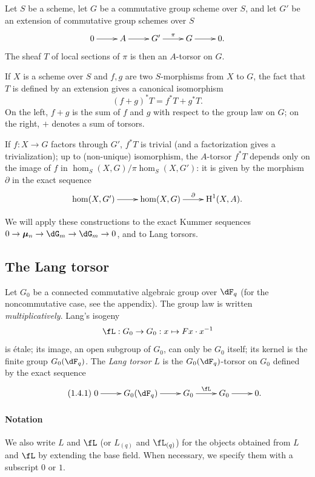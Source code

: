 Let $S$ be a scheme, let $G$ be a commutative group scheme over $S$, and let $G'$ 
be an extension of commutative group schemes over $S$
\[\xymatrix{
  0 \ar[r] 
    & A \ar[r] 
    & G' \ar[r]^-\pi 
    & G \ar[r] 
    & 0 \text{.}
}\]
The sheaf $T$ of local sections of $\pi$ is then an $A$-torsor on 
$G$. 

If $X$ is a scheme over $S$ and $f,g$ are two $S$-morphisms from $X$ to $G$, 
the fact that $T$ is defined by an extension gives a canonical isomorphism 
\begin{equation*}\tag{1.3.1}\label{VI:eq:1-3-1}
  (f+g)^\ast T = f^\ast T + g^\ast T \text{.}
\end{equation*}
On the left, $f+g$ is the sum of $f$ and $g$ with respect to the group law on $G$; 
on the right, $+$ denotes a sum of torsors. 

If $f:X\to G$ factors through $G'$, $f^\ast T$ is trivial (and a 
factorization gives a trivialization); up to (non-unique) isomorphism, 
the $A$-torsor $f^\ast T$ depends only on the image of $f$ in 
$\hom_S(X,G)/\pi\hom_S(X,G')$: it is given by the morphism $\partial$ in 
the exact sequence 
\[\xymatrix{
  \hom(X,G') \ar[r] 
    & \hom(X,G) \ar[r]^-\partial 
    & \h^1(X,A) \text{.}
}\]

We will apply these constructions to the exact Kummer sequences 
$0 \to \dmu_n \to \dG_m \to \dG_m \to 0$, and to Lang torsors. 





\subsection{The Lang torsor}\label{VI:1-4}

Let $G_0$ be a connected commutative algebraic group over $\dF_q$ (for the 
noncommutative case, see the appendix). The group law is written 
\emph{multiplicatively}. Lang's isogeny 
\[
\fL:G_0 \to G_0: x\mapsto F x\cdot x^{-1}
\]
is étale; its image, an open subgroup of $G_0$, can only be 
$G_0$ itself; its kernel is the finite group $G_0(\dF_q)$. The \emph{Lang 
torsor} $L$ is the $G_0(\dF_q)$-torsor on $G_0$ defined by the exact sequence 
\begin{equation*}\tag{1.4.1}\label{VI:eq:1-4-1}
\xymatrix{
  0 \ar[r] 
    & G_0(\dF_q) \ar[r] 
    & G_0 \ar[r]^-\fL 
    & G_0 \ar[r] 
    & 0 \text{.}
}
\end{equation*}

\paragraph{Notation}
We also write $L$ and $\fL$ (or $L_{(q)}$ and $\fL_{(q)}$) for the objects obtained 
from $L$ and $\fL$ by extending the base field. When necessary, we 
specify them with a subscript $0$ or $1$.


